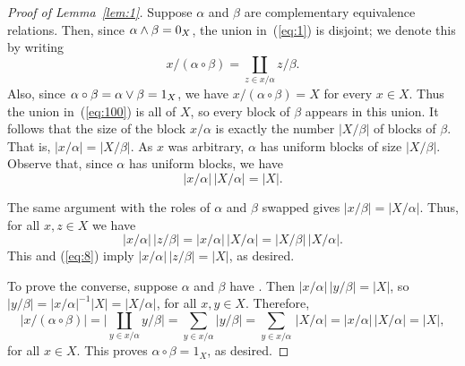 \begin{proof}[Proof of Lemma~\ref{lem:1}]
Suppose $\alpha$ and $\beta$ are complementary
equivalence relations.  Then, since $\alpha \wedge \beta = 0_X$,
the union in~(\ref{eq:1}) is disjoint; we denote this by writing
  \begin{equation}
    \label{eq:100}
x/(\alpha\circ \beta) = \coprod_{z \in x/\alpha} z/\beta.
  \end{equation}
Also, since 
$\alpha \circ \beta = \alpha \vee \beta = 1_X$, we have 
$x/(\alpha\circ \beta) =  X$ for 
every $x\in X$.
Thus the union in~(\ref{eq:100}) is all of $X$,
so every block of $\beta$ appears in this union.
It follows that the size of the block $x/\alpha$ is exactly  
the number $|X/\beta|$ of blocks of $\beta$. 
That is, $|x/\alpha| =|X/\beta|$.
As $x$ was arbitrary, $\alpha$ has uniform
blocks of size %
$|X/\beta|$. %
Observe that, since $\alpha$ has uniform blocks, we have
\begin{equation}
\label{eq:8}
|x/\alpha|\, |X/\alpha| = |X|.  
\end{equation}

The same argument with the roles of 
$\alpha$ and $\beta$ swapped gives
$|x/\beta| = |X/\alpha|$. %
Thus, for all $x, z\in X$ we have
\[
|x/\alpha|\, |z/\beta| 
 = |x/\alpha| \,|X/\alpha|
 = |X/\beta|\, |X/\alpha|.
\]
This and (\ref{eq:8}) imply
$|x/\alpha|\, |z/\beta| = |X|$, as desired.

To prove the converse, suppose $\alpha$ and $\beta$ have \cubs.
Then $|x/\alpha|\, |y/\beta| = |X|$, 
so $|y/\beta| = |x/\alpha|^{-1}  |X|  =  |X/\alpha|$, for all 
$x, y\in X$. 
Therefore, 
\[
\bigl|x/(\alpha\circ \beta)\bigr| = \bigl|\coprod_{y\in x/\alpha} y/\beta\bigr|
= \sum_{y \in x/\alpha} |y/\beta|= \sum_{y \in x/\alpha} \, |X/\alpha| = |x/\alpha| \, |X/\alpha| = |X|,
\]
for all $x\in X$. This proves $\alpha\circ \beta = 1_X$, as desired.
\end{proof}


